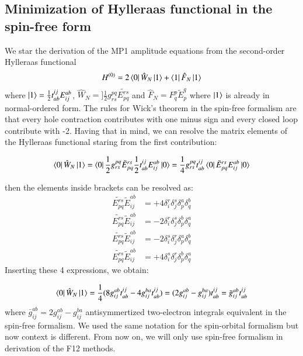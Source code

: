 \documentclass[journal=jacsat]{achemso}
\numberwithin{equation}{section}
\begin{document}
\subsection{Minimization of Hylleraas functional in the spin-free form}
We star the derivation of the MP1 amplitude equations from the second-order Hylleraas functional
\begin{align}
H^{(0)}=2\bra{0}\hat{W}_{N}\ket{1}+\bra{1}\hat{F}_{N}\ket{1}
\end{align}
where $\ket{1}=\frac{1}{2}t^{ij}_{ab}E^{ab}_{ij}$, $\hat{W}_{N}=]\frac{1}{2}g^{pq}_{rs}\tilde{E^{rs}_{pq}}$ and $\hat{F}_{N}=F^{p}_{q}\tilde{E}^{q}_{p}$ where $\ket{1}$ is already in normal-ordered form. The rules for Wick's theorem in the spin-free formalism are that every hole contraction contributes with one minus sign and every closed loop contribute with -2. Having that in mind, we can resolve the matrix elements of the Hylleraas functional staring from the first contribution:

\begin{align}
\bra{0}\hat{W}_{N}\ket{1}=\bra{0}\frac{1}{2}g^{pq}_{rs}\tilde{E}^{rs}_{pq}\frac{1}{2}t^{ij}_{ab}E^{ab}_{ij}\ket{0}=\frac{1}{4}g^{pq}_{rs}t^{ij}_{ab}\bra{0}\tilde{E}^{rs}_{pq}E^{ab}_{ij}\ket{0}
\end{align}

then the elements inside brackets can be resolved as:
\begin{align}
\tilde{E^{rs}_{pq}}\tilde{E}^{ab}_{ij}&=+4\delta^{r}_{i}\delta^{s}_{j}\delta^{a}_{p}\delta^{b}_{q}\\
\tilde{E^{rs}_{pq}}\tilde{E}^{ab}_{ij}&=-2\delta^{r}_{i}\delta^{s}_{j}\delta^{b}_{p}\delta^{a}_{q}\\
\tilde{E^{rs}_{pq}}\tilde{E}^{ab}_{ij}&=-2\delta^{s}_{i}\delta^{r}_{j}\delta^{a}_{p}\delta^{b}_{q}\\
\tilde{E^{rs}_{pq}}\tilde{E}^{ab}_{ij}&=+4\delta^{s}_{i}\delta^{r}_{j}\delta^{b}_{p}\delta^{a}_{q}
\end{align}
Inserting these 4 expressions, we obtain:


\begin{align}
\bra{0}\hat{W}_{N}\ket{1}=\frac{1}{4}(8g^{ab}_{ij}t^{ij}_{ab}-4g^{ba}_{ij}t^{ij}_{ab})=(2g^{ab}_{ij}-g^{ba}_{ij})t^{ij}_{ab}=\bar{g}^{ab}_{ij}t^{ij}_{ab}
\end{align}
where $\bar{g}^{ab}_{ij}=2g^{ab}_{ij}-g^{ba}_{ij}$ antisymmertized two-electron integrals equivalent in the spin-free formalism. We used the same notation for the spin-orbital formalism but now context is different. From now on, we will only use spin-free formalism in derivation of the F12 methods.
\end{document}
